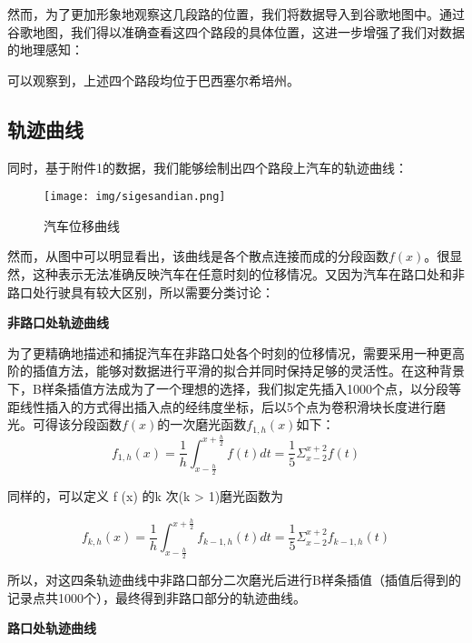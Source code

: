 \documentclass[withoutpreface,bwprint]{cumcmthesis} %
\begin{document}
\newpage
然而，为了更加形象地观察这几段路的位置，我们将数据导入到谷歌地图中。通过谷歌地图，我们得以准确查看这四个路段的具体位置，这进一步增强了我们对数据的地理感知：



可以观察到，上述四个路段均位于巴西塞尔希培州。

\subsection{轨迹曲线}


同时，基于附件1的数据，我们能够绘制出四个路段上汽车的轨迹曲线：


\begin{figure}[htbp]
    \centering
    \texttt{[image: img/sigesandian.png]}
     \captionsetup{font=small, position=below}
    \caption{汽车位移曲线}
    
\end{figure}



然而，从图中可以明显看出，该曲线是各个散点连接而成的分段函数$f(x)$。很显然，这种表示无法准确反映汽车在任意时刻的位移情况。又因为汽车在路口处和非路口处行驶具有较大区别，所以需要分类讨论：


\textbf{非路口处轨迹曲线}



为了更精确地描述和捕捉汽车在非路口处各个时刻的位移情况，需要采用一种更高阶的插值方法，能够对数据进行平滑的拟合并同时保持足够的灵活性。在这种背景下，B样条插值方法成为了一个理想的选择\supercite{[3]}，我们拟定先插入1000个点，以分段等距线性插入的方式得出插入点的经纬度坐标，后以5个点为卷积滑块长度进行磨光。可得该分段函数$f(x)$的一次磨光函数$f_{1,h}(x) $如下：
\begin{equation}
f_{1,h}(x) = \frac{1}{h}{\int_{x - \frac{h}{2}}^{x + \frac{h}{2}}{f(t)}}dt= \frac{1}{5}{\Sigma_{x - 2}^{x + 2}{f(t)}}
\end{equation}

同样的，可以定义 f (x) 的k 次(k > 1)磨光函数为

\begin{equation}
f_{k,h}(x) = \frac{1}{h}{\int_{x - \frac{h}{2}}^{x + \frac{h}{2}}{f_{k - 1,h}(t)}}dt= \frac{1}{5}{\Sigma_{x - 2}^{x + 2}{f_{k - 1,h}(t)}}
\end{equation}

所以，对这四条轨迹曲线中非路口部分二次磨光后进行B样条插值（插值后得到的记录点共1000个），最终得到非路口部分的轨迹曲线。

\textbf{路口处轨迹曲线}
\end{document}

